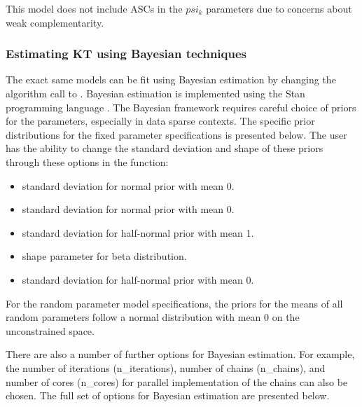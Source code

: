 This model does not include ASCs in the \(psi_k\) parameters due to
concerns about weak complementarity.

\hypertarget{estimating-kt-using-bayesian-techniques}{%
\subsubsection{Estimating KT using Bayesian
techniques}\label{estimating-kt-using-bayesian-techniques}}

The exact same models can be fit using Bayesian estimation by changing
the algorithm call to . Bayesian estimation is implemented
using the Stan programming language \citep{carpenterstan2017}. The
Bayesian framework requires careful choice of priors for the parameters,
especially in data sparse contexts. The specific prior distributions for
the fixed parameter specifications is presented below. The user has the
ability to change the standard deviation and shape of these priors
through these options in the  function:

\begin{itemize}
\tightlist
\item
   standard deviation for normal prior with mean 0.
\item
   standard deviation for normal prior with mean 0.
\item
   standard deviation for half-normal prior with
  mean 1.
\item
   shape parameter for beta distribution.
\item
   standard deviation for half-normal prior with
  mean 0.
\end{itemize}

For the random parameter model specifications, the priors for the means
of all random parameters follow a normal distribution with mean 0 on the
unconstrained space.

There are also a number of further options for Bayesian estimation. For
example, the number of iterations (n\_iterations), number of chains
(n\_chains), and number of cores (n\_cores) for parallel implementation
of the chains can also be chosen. The full set of options for Bayesian
estimation are presented below.

